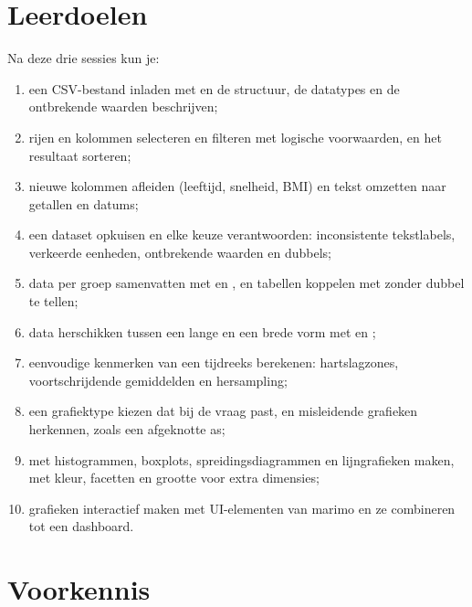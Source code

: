 \documentclass[11pt,a4paper]{article}
\begin{document}



\section{Leerdoelen}

Na deze drie sessies kun je:

\begin{enumerate}[label=\textbf{LD\arabic*}, leftmargin=1.4cm]
  \item een CSV-bestand inladen met  en de structuur, de
        datatypes en de ontbrekende waarden beschrijven;
  \item rijen en kolommen selecteren en filteren met logische
        voorwaarden, en het resultaat sorteren;
  \item nieuwe kolommen afleiden (leeftijd, snelheid, BMI) en tekst
        omzetten naar getallen en datums;
  \item een dataset opkuisen en elke keuze verantwoorden: inconsistente
        tekstlabels, verkeerde eenheden, ontbrekende waarden en dubbels;
  \item data per groep samenvatten met  en , en
        tabellen koppelen met  zonder dubbel te tellen;
  \item data herschikken tussen een lange en een brede vorm met
         en ;
  \item eenvoudige kenmerken van een tijdreeks berekenen: hartslagzones,
        voortschrijdende gemiddelden en hersampling;
  \item een grafiektype kiezen dat bij de vraag past, en misleidende
        grafieken herkennen, zoals een afgeknotte as;
  \item met  histogrammen, boxplots,
        spreidingsdiagrammen en lijngrafieken maken, met kleur, facetten
        en grootte voor extra dimensies;
  \item grafieken interactief maken met UI-elementen van marimo en ze
        combineren tot een dashboard.
\end{enumerate}

\section{Voorkennis}
\end{document}
